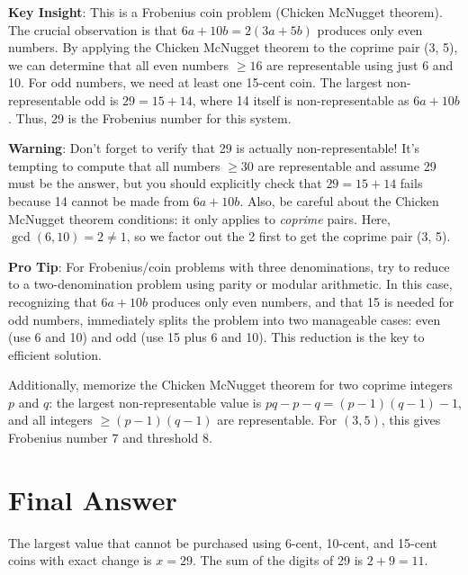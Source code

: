 \documentclass[12pt]{article}
\begin{document}
\begin{keyinsightbox}
\textbf{Key Insight}: This is a Frobenius coin problem (Chicken McNugget theorem). The crucial observation is that $6a + 10b = 2(3a + 5b)$ produces only even numbers. By applying the Chicken McNugget theorem to the coprime pair (3, 5), we can determine that all even numbers $\geq 16$ are representable using just 6 and 10. For odd numbers, we need at least one 15-cent coin. The largest non-representable odd is $29 = 15 + 14$, where 14 itself is non-representable as $6a + 10b$. Thus, 29 is the Frobenius number for this system.
\end{keyinsightbox}

\begin{warningbox}
\textbf{Warning}: Don't forget to verify that 29 is actually non-representable! It's tempting to compute that all numbers $\geq 30$ are representable and assume 29 must be the answer, but you should explicitly check that $29 = 15 + 14$ fails because 14 cannot be made from $6a + 10b$. Also, be careful about the Chicken McNugget theorem conditions: it only applies to \textit{coprime} pairs. Here, $\gcd(6, 10) = 2 \neq 1$, so we factor out the 2 first to get the coprime pair (3, 5).
\end{warningbox}

\begin{tipbox}
\textbf{Pro Tip}: For Frobenius/coin problems with three denominations, try to reduce to a two-denomination problem using parity or modular arithmetic. In this case, recognizing that $6a + 10b$ produces only even numbers, and that 15 is needed for odd numbers, immediately splits the problem into two manageable cases: even (use 6 and 10) and odd (use 15 plus 6 and 10). This reduction is the key to efficient solution.

Additionally, memorize the Chicken McNugget theorem for two coprime integers $p$ and $q$: the largest non-representable value is $pq - p - q = (p-1)(q-1) - 1$, and all integers $\geq (p-1)(q-1)$ are representable. For $(3, 5)$, this gives Frobenius number 7 and threshold 8.
\end{tipbox}

\section*{Final Answer}

The largest value that cannot be purchased using 6-cent, 10-cent, and 15-cent coins with exact change is $x = 29$. The sum of the digits of 29 is $2 + 9 = 11$.
\end{document}
